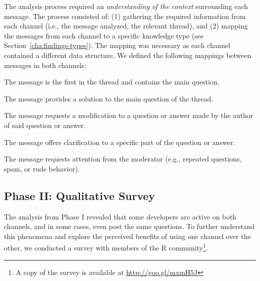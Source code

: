 
The analysis process required an \textit{understanding of the context} surrounding each message. The process consisted of: (1) gathering the required information from each channel (i.e., the message analyzed, the relevant thread), and (2) mapping the messages from each channel to a specific knowledge type (see Section~\ref{cha:findings-types}). The mapping was necessary as each channel contained a different data structure.
We defined the following mappings between messages in both channels:

	\begin{description}[itemsep=1pt, topsep=2pt, leftmargin=1em, parsep=0pt]
		\item[Question:] The message is the first in the thread and contains the main question.
		\item[Answer:] The message provides a solution to the main question of the thread.
	 	\item[Update:] The message requests a modification to a question or answer made by the author of said question or answer.
		\item[Comment:] The message offers clarification to a specific part of the question or answer.
		\item[Flag:] The message requests attention from the moderator (e.g., repeated questions, spam, or rude behavior).
	\end{description}


\subsection{Phase II: Qualitative Survey}

The analysis from Phase I revealed that some developers are active on both channels, and in some cases, even post the same questions. To further understand this phenomena and explore the perceived benefits of using one channel over the other, we conducted a survey with members of the R community\footnote{A copy of the survey is available at \url{http://goo.gl/mxmH5J}}. %

